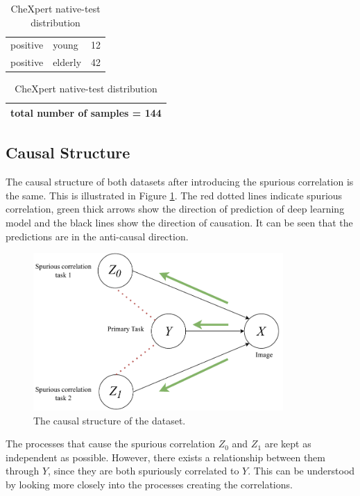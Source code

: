 \documentclass[12pt,DIV14,BCOR12mm,a4paper,footinclude=false,headinclude,parskip=half-,twoside,openright,cleardoublepage=empty,toc=index,bibliography=totoc,listof=totoc]{scrreprt}
\numberwithin{equation}{chapter}
\begin{document}
\begin{table}[H]
\begin{minipage}[H]{\linewidth}
\begin{minipage}[H]{0.5\linewidth}
\begin{tabular}{|p{1.25cm}|p{1.75cm}|p{2cm}|}
                positive & young & 12 \\
                positive & elderly & 42\\
                \hline
            \end{tabular}
            \begin{tabular}{|p{5.88cm}|}
                 \hline
                 total number of samples = 144\\
                 \hline
            \end{tabular}
        \end{minipage}%
        \caption{CheXpert native-test distribution} 
        \label{tab:Native-testChX}
    \end{minipage}%
\end{table}

\subsection{Causal Structure}\label{sec:3.1.3}
The causal structure of both datasets after introducing the spurious correlation is the same. This is illustrated in Figure \ref{fig:causal_structure}. The red dotted lines indicate spurious correlation, green thick arrows show the direction of prediction of deep learning model and the black lines show the direction of causation. It can be seen that the predictions are in the anti-causal direction.

\begin{figure}[H]
\centering
\includegraphics[height=6cm]{thesis/figures/causal_structure.pdf}
\caption{The causal structure of the dataset.}
\label{fig:causal_structure}
\end{figure}

The processes that cause the spurious correlation $Z_0$ and $Z_1$ are kept as independent as possible. However, there exists a relationship between them through $Y$, since they are both spuriously correlated to $Y$. This can be understood by looking more closely into the processes creating the correlations.
\end{document}

